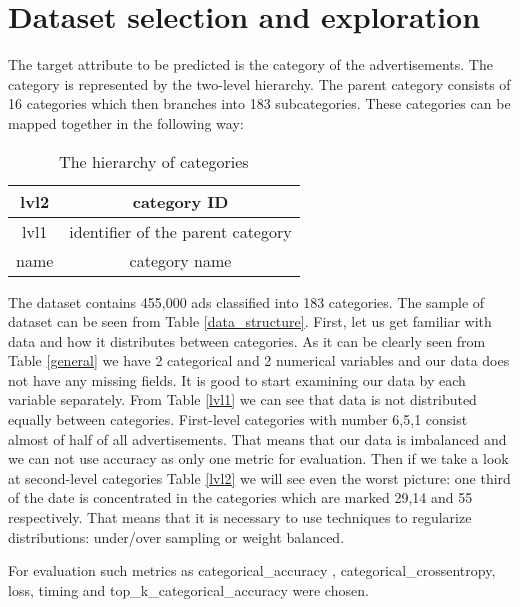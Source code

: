 \section{Dataset selection and exploration} \label{sect3_2}

The target attribute to be predicted is the category of the advertisements. The category is represented by the two-level hierarchy. The parent category consists of 16 categories which then branches into 183 subcategories. These categories can be mapped together in the following way:

\begin{table}[h]
	\centering
	\caption{The hierarchy of categories}
	\label{my-label}
	\begin{tabular}{|c|c|}
		\hline
		
		lvl2     & category ID     \\
		\hline
		lvl1 		  & identifier of the parent category		 \\
		\hline
		name	 		  & category name		 \\
		\hline
	\end{tabular}
\end{table}

The dataset contains 455,000 ads classified into 183 categories. 
The sample of dataset can be seen from Table \ref{data_structure}.
First, let us get familiar with data and how it distributes between categories.
As it can be clearly seen from Table \ref{general} we have 2 categorical 
and 2 numerical variables and our data does not have any missing fields. 
It is good to start examining our data by each variable separately. 
From Table \ref{lvl1} we can see that data is not distributed equally between 
categories. First-level categories with number 6,5,1 consist almost of half 
of all advertisements. That means that our data is imbalanced and we can not 
use accuracy as only one metric for evaluation. 
Then if we take a look at second-level categories Table \ref{lvl2} we will see even the worst picture: one third of the date is concentrated in the categories which are marked 29,14 and 55 respectively. 
That means that it is necessary to use techniques to regularize distributions: under/over sampling or weight balanced.

For evaluation such metrics as categorical\_accuracy
, categorical\_crossentropy, loss, timing and top\_k\_categorical\_accuracy were chosen. 


